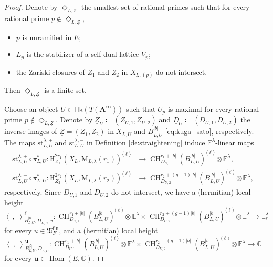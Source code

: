 \documentclass[12pt]{amsart}
\numberwithin{equation}{section}
\theoremstyle{plain}
\theoremstyle{definition}
\theoremstyle{remark}
\renewcommand{\b}[1]{\mathbf{#1}}
\renewcommand{\d}[1]{\mathbb{#1}}
\newcommand{\f}[1]{\mathfrak{#1}}
\renewcommand{\r}[1]{\mathrm{#1}}
\renewcommand{\sf}[1]{\mathsf{#1}}
\renewcommand{\(}{\left(}
\renewcommand{\)}{\right)}
\newcommand{\ang}[1]{\langle{#1}\rangle}
\newcommand{\ul}{\underline}
\newcommand{\bA}{\b A}
\newcommand{\dC}{\d C}
\newcommand{\dE}{\d E}
\newcommand{\fV}{\f V}
\newcommand{\rH}{\r H}
\newcommand{\rM}{\r M}
\newcommand{\bbu}{\boldsymbol{u}}
\newcommand{\llangle}{\left\langle}
\newcommand{\rrangle}{\right\rangle}
\newcommand{\fin}{\r{fin}}
\newcommand{\st}{\r{st}}
\newcommand{\Hk}{\sf{Hk}}
\DeclareMathOperator{\CH}{CH}
\DeclareMathOperator{\Hom}{Hom}
\begin{document}
\begin{proof}
Denote by $\Diamond_{L,\ul{Z}}$ the smallest set of rational primes such that for every rational prime $p\not\in\Diamond_{L,\ul{Z}}$,
\begin{itemize}
  \item $p$ is unramified in $E$;

  \item $L_p$ is the stabilizer of a self-dual lattice $V_p$;

  \item the Zariski closures of $Z_1$ and $Z_2$ in $X_{L,(p)}$ do not intersect.
\end{itemize}
Then $\Diamond_{L,\ul{Z}}$ is a finite set.

Choose an object $U\in\Hk(T(\bA^\infty))$ such that $U_p$ is maximal for every rational prime $p\not\in\Diamond_{L,\ul{Z}}$. Denote by $\ul{Z}_U\coloneqq(Z_{U,1},Z_{U,2})$ and $\ul{D}_U\coloneqq(D_{U,1},D_{U,2})$ the inverse images of $\ul{Z}=(Z_1,Z_2)$ in $X_{L,U}$ and $B_{L,U}^{|b|}$ \eqref{eq:kuga_sato}, respectively. The maps $\st_{L,U}^{\lambda,+}$ and $\st_{L,U}^{\lambda,-}$ in Definition \ref{de:straightening} induce $\dE^\lambda$-linear maps
\begin{align*}
\st_{L,U}^{\lambda,+}\circ\pi_{L,U}^*\colon\rH^{2r_1}_{Z_1}(X_L,\rM_{L,\lambda}(r_1))^{\ang\ell}
&\to\CH^{r_1+|b|}_{D_{U,1}}(B_{L,U}^{|b|})^{\ang\ell}\otimes\dE^\lambda, \\
\st_{L,U}^{\lambda,-}\circ\pi_{L,U}^*\colon\rH^{2r_2}_{Z_2}(X_L,\rM_{L,\lambda}(r_2))^{\ang\ell}
&\to\CH^{r_2+(g-1)|b|}_{D_{U,2}}(B_{L,U}^{|b|})^{\ang\ell}\otimes\dE^\lambda,
\end{align*}
respectively. Since $D_{U,1}$ and $D_{U,2}$ do not intersect, we have a (hermitian) local height
\[
\llangle\;,\;\rrangle_{B_{L,U}^{|b|},\ul{D}_{L,U},u}^\ell\colon
\CH^{r_1+|b|}_{D_{U,1}}(B_{L,U}^{|b|})^{\ang\ell}\otimes\dE^\lambda\times
\CH^{r_2+(g-1)|b|}_{D_{U,2}}(B_{L,U}^{|b|})^{\ang\ell}\otimes\dE^\lambda\to\dE^\lambda_\ell
\]
for every $u\in\fV_F^\fin$, and a (hermitian) local height
\[
\llangle\;,\;\rrangle_{B_{L,U}^{|b|},\ul{D}_{L,U}}^{\bbu}\colon
\CH^{r_1+|b|}_{D_{U,1}}(B_{L,U}^{|b|})^{\ang\ell}\otimes\dE^\lambda\times
\CH^{r_2+(g-1)|b|}_{D_{U,2}}(B_{L,U}^{|b|})^{\ang\ell}\otimes\dE^\lambda\to\dC
\]
for every $\bbu\in\Hom(E,\dC)$.


\end{proof}
\end{document}
